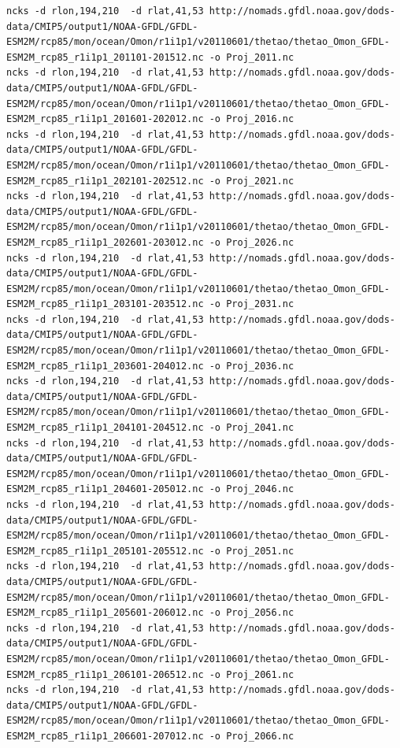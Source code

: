 \documentclass[11pt]{article}
\begin{document}
\begin{itemize}
\begin{itemize}
\begin{verbatim}
ncks -d rlon,194,210  -d rlat,41,53 http://nomads.gfdl.noaa.gov/dods-data/CMIP5/output1/NOAA-GFDL/GFDL-ESM2M/rcp85/mon/ocean/Omon/r1i1p1/v20110601/thetao/thetao_Omon_GFDL-ESM2M_rcp85_r1i1p1_201101-201512.nc -o Proj_2011.nc
ncks -d rlon,194,210  -d rlat,41,53 http://nomads.gfdl.noaa.gov/dods-data/CMIP5/output1/NOAA-GFDL/GFDL-ESM2M/rcp85/mon/ocean/Omon/r1i1p1/v20110601/thetao/thetao_Omon_GFDL-ESM2M_rcp85_r1i1p1_201601-202012.nc -o Proj_2016.nc
ncks -d rlon,194,210  -d rlat,41,53 http://nomads.gfdl.noaa.gov/dods-data/CMIP5/output1/NOAA-GFDL/GFDL-ESM2M/rcp85/mon/ocean/Omon/r1i1p1/v20110601/thetao/thetao_Omon_GFDL-ESM2M_rcp85_r1i1p1_202101-202512.nc -o Proj_2021.nc
ncks -d rlon,194,210  -d rlat,41,53 http://nomads.gfdl.noaa.gov/dods-data/CMIP5/output1/NOAA-GFDL/GFDL-ESM2M/rcp85/mon/ocean/Omon/r1i1p1/v20110601/thetao/thetao_Omon_GFDL-ESM2M_rcp85_r1i1p1_202601-203012.nc -o Proj_2026.nc
ncks -d rlon,194,210  -d rlat,41,53 http://nomads.gfdl.noaa.gov/dods-data/CMIP5/output1/NOAA-GFDL/GFDL-ESM2M/rcp85/mon/ocean/Omon/r1i1p1/v20110601/thetao/thetao_Omon_GFDL-ESM2M_rcp85_r1i1p1_203101-203512.nc -o Proj_2031.nc
ncks -d rlon,194,210  -d rlat,41,53 http://nomads.gfdl.noaa.gov/dods-data/CMIP5/output1/NOAA-GFDL/GFDL-ESM2M/rcp85/mon/ocean/Omon/r1i1p1/v20110601/thetao/thetao_Omon_GFDL-ESM2M_rcp85_r1i1p1_203601-204012.nc -o Proj_2036.nc
ncks -d rlon,194,210  -d rlat,41,53 http://nomads.gfdl.noaa.gov/dods-data/CMIP5/output1/NOAA-GFDL/GFDL-ESM2M/rcp85/mon/ocean/Omon/r1i1p1/v20110601/thetao/thetao_Omon_GFDL-ESM2M_rcp85_r1i1p1_204101-204512.nc -o Proj_2041.nc
ncks -d rlon,194,210  -d rlat,41,53 http://nomads.gfdl.noaa.gov/dods-data/CMIP5/output1/NOAA-GFDL/GFDL-ESM2M/rcp85/mon/ocean/Omon/r1i1p1/v20110601/thetao/thetao_Omon_GFDL-ESM2M_rcp85_r1i1p1_204601-205012.nc -o Proj_2046.nc
ncks -d rlon,194,210  -d rlat,41,53 http://nomads.gfdl.noaa.gov/dods-data/CMIP5/output1/NOAA-GFDL/GFDL-ESM2M/rcp85/mon/ocean/Omon/r1i1p1/v20110601/thetao/thetao_Omon_GFDL-ESM2M_rcp85_r1i1p1_205101-205512.nc -o Proj_2051.nc
ncks -d rlon,194,210  -d rlat,41,53 http://nomads.gfdl.noaa.gov/dods-data/CMIP5/output1/NOAA-GFDL/GFDL-ESM2M/rcp85/mon/ocean/Omon/r1i1p1/v20110601/thetao/thetao_Omon_GFDL-ESM2M_rcp85_r1i1p1_205601-206012.nc -o Proj_2056.nc
ncks -d rlon,194,210  -d rlat,41,53 http://nomads.gfdl.noaa.gov/dods-data/CMIP5/output1/NOAA-GFDL/GFDL-ESM2M/rcp85/mon/ocean/Omon/r1i1p1/v20110601/thetao/thetao_Omon_GFDL-ESM2M_rcp85_r1i1p1_206101-206512.nc -o Proj_2061.nc
ncks -d rlon,194,210  -d rlat,41,53 http://nomads.gfdl.noaa.gov/dods-data/CMIP5/output1/NOAA-GFDL/GFDL-ESM2M/rcp85/mon/ocean/Omon/r1i1p1/v20110601/thetao/thetao_Omon_GFDL-ESM2M_rcp85_r1i1p1_206601-207012.nc -o Proj_2066.nc

\end{verbatim}
\end{itemize}
\end{itemize}
\end{document}
